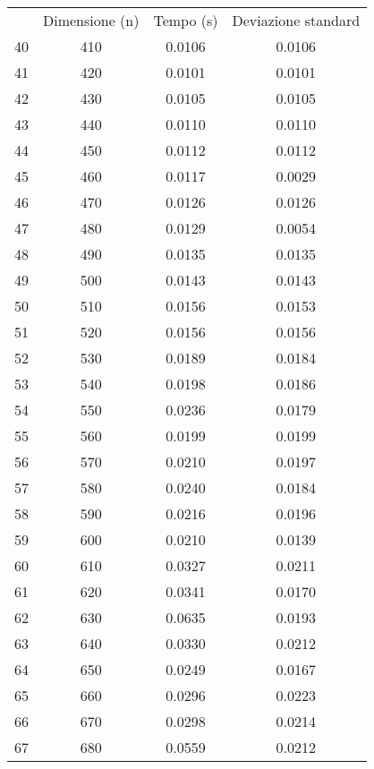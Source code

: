 \begin{table}
\centering
\begin{adjustbox}{width=1\textwidth/2}
\begin{tabular}{|c|c|c|c|}
\hline
 & Dimensione (n) & Tempo (s) & Deviazione standard \\
40 & 410 & 0.0106 & 0.0106 \\
\cline{1-4}
41 & 420 & 0.0101 & 0.0101 \\
\cline{1-4}
42 & 430 & 0.0105 & 0.0105 \\
\cline{1-4}
43 & 440 & 0.0110 & 0.0110 \\
\cline{1-4}
44 & 450 & 0.0112 & 0.0112 \\
\cline{1-4}
45 & 460 & 0.0117 & 0.0029 \\
\cline{1-4}
46 & 470 & 0.0126 & 0.0126 \\
\cline{1-4}
47 & 480 & 0.0129 & 0.0054 \\
\cline{1-4}
48 & 490 & 0.0135 & 0.0135 \\
\cline{1-4}
49 & 500 & 0.0143 & 0.0143 \\
\cline{1-4}
50 & 510 & 0.0156 & 0.0153 \\
\cline{1-4}
51 & 520 & 0.0156 & 0.0156 \\
\cline{1-4}
52 & 530 & 0.0189 & 0.0184 \\
\cline{1-4}
53 & 540 & 0.0198 & 0.0186 \\
\cline{1-4}
54 & 550 & 0.0236 & 0.0179 \\
\cline{1-4}
55 & 560 & 0.0199 & 0.0199 \\
\cline{1-4}
56 & 570 & 0.0210 & 0.0197 \\
\cline{1-4}
57 & 580 & 0.0240 & 0.0184 \\
\cline{1-4}
58 & 590 & 0.0216 & 0.0196 \\
\cline{1-4}
59 & 600 & 0.0210 & 0.0139 \\
\cline{1-4}
60 & 610 & 0.0327 & 0.0211 \\
\cline{1-4}
61 & 620 & 0.0341 & 0.0170 \\
\cline{1-4}
62 & 630 & 0.0635 & 0.0193 \\
\cline{1-4}
63 & 640 & 0.0330 & 0.0212 \\
\cline{1-4}
64 & 650 & 0.0249 & 0.0167 \\
\cline{1-4}
65 & 660 & 0.0296 & 0.0223 \\
\cline{1-4}
66 & 670 & 0.0298 & 0.0214 \\
\cline{1-4}
67 & 680 & 0.0559 & 0.0212 \\
\cline{1-4}

\end{tabular}
\end{adjustbox}
\end{table}
